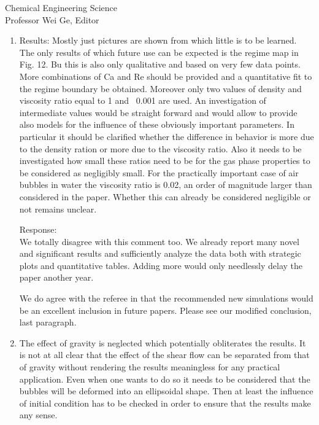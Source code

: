 \documentclass{letter}
\begin{document}
\begin{letter}{
Chemical Engineering Science\\
Professor Wei Ge, Editor\\}
\begin{enumerate}
\par\noindent
\item
\textsf
{Results: Mostly just pictures are shown from which little is to be learned. The only results of which future use can be expected is the regime map in Fig. 12. Bu this is also only qualitative and based on very few data points. More combinations of Ca and Re should be provided and a quantitative fit to the regime boundary be obtained. Moreover only two values of density and viscosity ratio equal to 1 and ~0.001 are used. An investigation of intermediate values would be straight forward and would allow to provide also models for the influence of these obviously important parameters. In particular it should be clarified whether the difference in behavior is more due to the density ration or more due to the viscosity ratio. Also it needs to be investigated how small these ratios need to be for the gas phase properties to be considered as negligibly small. For the practically important case of air bubbles in water the viscosity ratio is 0.02, an order of magnitude larger than considered in the paper. Whether this can already be considered negligible or not remains unclear.}
\vspace{3 mm}

Response: \\
We totally disagree with this comment too.  We already report many novel and significant results and sufficiently analyze the data both with strategic plots and quantitative tables.  Adding more would only needlessly delay the paper another year.  
\par
We do agree with the referee in that the recommended new simulations would be an excellent inclusion in future papers.  Please see our modified conclusion, last paragraph.



\par\noindent
\item
\textsf
{The effect of gravity is neglected which potentially obliterates the results. It is not at all clear that the effect of the shear flow can be separated from that of gravity without rendering the results meaningless for any practical application. Even when one wants to do so it needs to be considered that the bubbles will be deformed into an ellipsoidal shape. Then at least the influence of initial condition has to be checked in order to ensure that the results make any sense. \\}
\vspace{3 mm}


\end{enumerate}
\end{letter}
\end{document}
